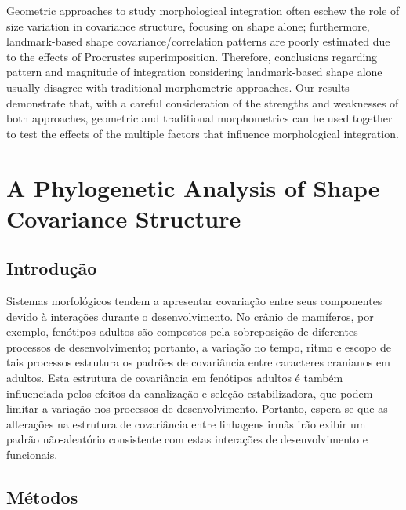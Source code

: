\documentclass[11pt,twoside]{report}
\begin{document}
Geometric approaches to study morphological integration often eschew the
role of size variation in covariance structure, focusing on shape alone;
furthermore, landmark-based shape covariance/correlation patterns are
poorly estimated due to the effects of Procrustes superimposition.
Therefore, conclusions regarding pattern and magnitude of integration
considering landmark-based shape alone usually disagree with traditional
morphometric approaches. Our results demonstrate that, with a careful
consideration of the strengths and weaknesses of both approaches,
geometric and traditional morphometrics can be used together to test the
effects of the multiple factors that influence morphological
integration.

\newpage
\chapter{A Phylogenetic Analysis of Shape Covariance Structure}
\label{ch:ppca}

\section{Introdução}\label{introducao}

Sistemas morfológicos tendem a apresentar covariação entre seus
componentes devido à interações durante o desenvolvimento. No crânio de
mamíferos, por exemplo, fenótipos adultos são compostos pela
sobreposição de diferentes processos de desenvolvimento; portanto, a
variação no tempo, ritmo e escopo de tais processos estrutura os padrões
de covariância entre caracteres cranianos em adultos. Esta estrutura de
covariância em fenótipos adultos é também influenciada pelos efeitos da
canalização e seleção estabilizadora, que podem limitar a variação nos
processos de desenvolvimento. Portanto, espera-se que as alterações na
estrutura de covariância entre linhagens irmãs irão exibir um padrão
não-aleatório consistente com estas interações de desenvolvimento e
funcionais.

\section{Métodos}\label{metodos}
\end{document}
